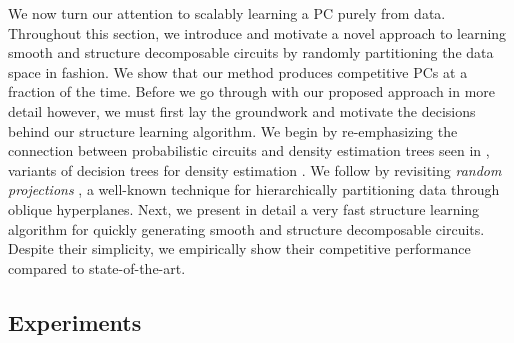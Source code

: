 We now turn our attention to scalably learning a PC purely from data. Throughout this section, we
introduce and motivate a novel approach to learning smooth and structure decomposable circuits by
randomly partitioning the data space in \divclass{} fashion. We show that our method produces
competitive PCs at a fraction of the time. Before we go through with our proposed approach in more
detail however, we must first lay the groundwork and motivate the decisions behind our structure
learning algorithm. We begin by re-emphasizing the connection between probabilistic circuits and
density estimation trees seen in , variants of decision trees for density estimation
\citep{ram11,smyth95,hang19}. We follow by revisiting \emph{random projections}
\citep{dasgupta08a,dasgupta08b}, a well-known technique for hierarchically partitioning data
through oblique hyperplanes. Next, we present in detail a very fast structure learning algorithm
for quickly generating smooth and structure decomposable circuits. Despite their simplicity, we
empirically show their competitive performance compared to state-of-the-art.

\subsection{}

\subsection{Experiments}
